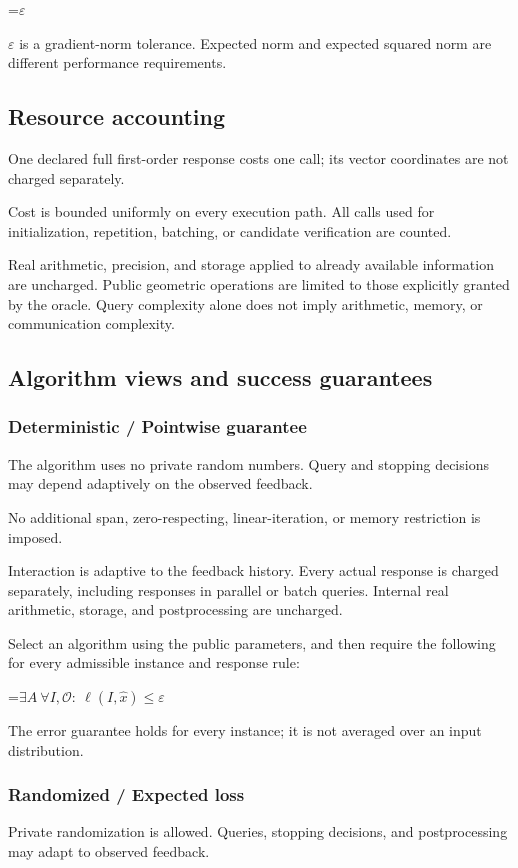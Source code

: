 \documentclass[10pt,a4paper]{article}
\newcommand{\AtlasMath}[1]{\par\begingroup\centering\setbox0=\hbox{$\displaystyle #1$}\ifdim\wd0>1.4\linewidth\typeout{ATLAS WIDE FORMULA: \the\wd0}\fi\ifdim\wd0>\linewidth\resizebox{\linewidth}{!}{\box0}\else\box0\fi\par\endgroup}
\newcommand{\AtlasInlineMath}[1]{\begingroup\setbox0=\hbox{$#1$}\ifdim\wd0>.4\linewidth\endgroup\AtlasMath{#1}\else\endgroup$#1$\fi}
\begin{document}
\AtlasInlineMath{\varepsilon} is a gradient-norm tolerance. Expected norm and expected squared norm are different performance requirements.

\subsection{Resource accounting}
One declared full first-order response costs one call; its vector coordinates are not charged separately.

Cost is bounded uniformly on every execution path. All calls used for initialization, repetition, batching, or candidate verification are counted.

Real arithmetic, precision, and storage applied to already available information are uncharged. Public geometric operations are limited to those explicitly granted by the oracle. Query complexity alone does not imply arithmetic, memory, or communication complexity.

\subsection{Algorithm views and success guarantees}
\subsubsection{Deterministic / Pointwise guarantee}
The algorithm uses no private random numbers. Query and stopping decisions may depend adaptively on the observed feedback.

No additional span, zero-respecting, linear-iteration, or memory restriction is imposed.

Interaction is adaptive to the feedback history. Every actual response is charged separately, including responses in parallel or batch queries. Internal real arithmetic, storage, and postprocessing are uncharged.

Select an algorithm using the public parameters, and then require the following for every admissible instance and response rule:


\AtlasMath{\exists A\ \forall I,\mathcal{O}:\ \ell(I,\widehat{x})\le\varepsilon}


The error guarantee holds for every instance; it is not averaged over an input distribution.

\subsubsection{Randomized / Expected loss}
Private randomization is allowed. Queries, stopping decisions, and postprocessing may adapt to observed feedback.
\end{document}
